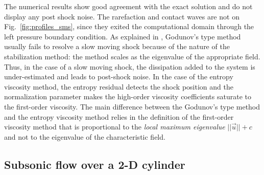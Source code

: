 \documentclass[preprint,10pt]{elsarticle}
\newcommand{\fig}[1]{Fig.~\ref{#1}}                      %
\begin{document}
%
The numerical results show good agreement with the exact solution and do not display any post shock noise. The rarefaction and contact waves are not on \fig{fig:profiles_sms}, since they exited the computational domain through the left pressure boundary condition. As explained in \cite{roberts}, Godunov's type method usually fails to resolve a slow moving shock because of the nature of the stabilization method: the method scales as the eigenvalue of the appropriate field. Thus, in the case of a slow moving shock, the dissipation added to the system is under-estimated and leads to post-shock noise. In the case of the entropy viscosity method, the entropy residual detects the shock position and the normalization parameter makes the high-order viscosity coefficients saturate to the first-order viscosity. The main difference between the Godunov's type method and the entropy viscosity method relies in the definition of the first-order viscosity method that is proportional to the \emph{local maximum eigenvalue} $||\vec{u}||+c$ and not to the eigenvalue of the characteristic field.

\subsection{Subsonic flow over a 2-D cylinder} \label{sec:cylinder}
\end{document}
